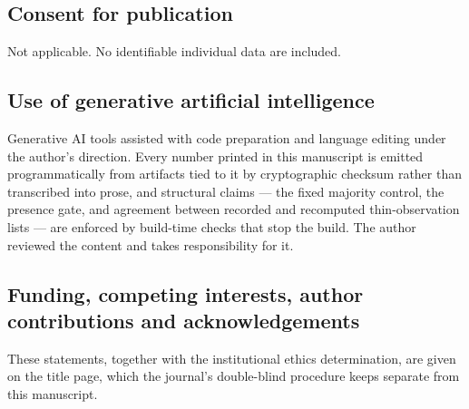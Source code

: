 \subsection*{Consent for publication}

Not applicable. No identifiable individual data are included.

\subsection*{Use of generative artificial intelligence}

Generative AI tools assisted with code preparation and language editing under
the author's direction. Every number printed in this manuscript is emitted
programmatically from artifacts tied to it by cryptographic checksum rather
than transcribed into prose, and structural claims --- the fixed majority
control, the presence gate, and agreement between recorded and recomputed
thin-observation lists --- are enforced by build-time checks that stop the
build. The author reviewed the content and takes responsibility for it.

\ifdefined\ANONYMOUS
\subsection*{Funding, competing interests, author contributions and
acknowledgements}

These statements, together with the institutional ethics determination, are
given on the title page, which the journal's double-blind procedure keeps
separate from this manuscript.
\else

\fi
